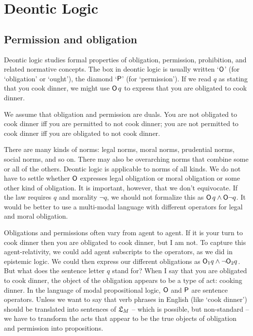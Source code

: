 \chapter{Deontic Logic}\label{ch:deontic}

\section{Permission and obligation}

Deontic logic studies formal properties of obligation, permission, prohibition,
and related normative concepts. The box in deontic logic is usually written
`$\operatorname{\mathsf{O}}$' (for `obligation' or `ought'), the diamond `$\operatorname{\mathsf{P}}$' (for `permission').
If we read $q$ as stating that you cook dinner, we might use $\operatorname{\mathsf{O}} q$ to express
that you are obligated to cook dinner.

We assume that obligation and permission are duals. You are not obligated to
cook dinner iff you are permitted to not cook dinner; you are not permitted to
cook dinner iff you are obligated to not cook dinner.

There are many kinds of norms: legal norms, moral norms, prudential norms,
social norms, and so on. There may also be overarching norms that combine some
or all of the others. Deontic logic is applicable to norms of all kinds. We do
not have to settle whether $\operatorname{\mathsf{O}}$ expresses legal obligation or moral obligation
or some other kind of obligation. It is important, however, that we don't
equivocate. If the law requires $q$ and morality $\neg q$, we should not
formalize this as $\operatorname{\mathsf{O}} q \land \operatorname{\mathsf{O}}\! \neg q$. It would be better to use a
multi-modal language with different operators for legal and moral obligation.


Obligations and permissions often vary from agent to agent. If it is your turn
to cook dinner then you are obligated to cook dinner, but I am not. To capture
this agent-relativity, we could add agent subscripts to the operators, as we did
in epistemic logic. We could then express our different obligations as
$\operatorname{\mathsf{O}}_1 \!q \land \neg \!\operatorname{\mathsf{O}}_2 \!q$. But what does the sentence letter $q$ stand for?
When I say that you are obligated to cook dinner, the object of the obligation
appears to be a type of act: cooking dinner. In the language of modal
propositional logic, $\operatorname{\mathsf{O}}$ and $\operatorname{\mathsf{P}}$ are sentence operators. Unless we want to
say that verb phrases in English (like `cook dinner') should be translated into
sentences of $\mathfrak{L}_M$ -- which is possible, but non-standard -- we have to
transform the acts that appear to be the true objects of obligation and
permission into propositions.


